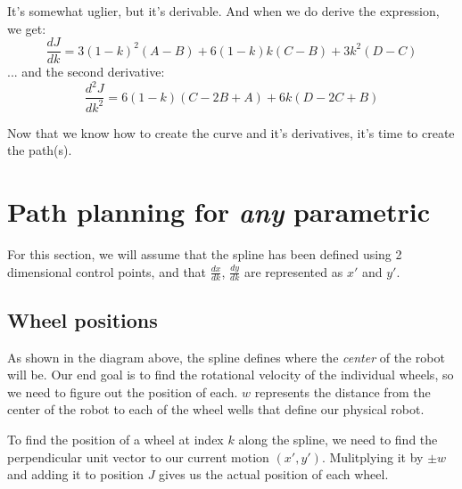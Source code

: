 \documentclass[12pt, english]{article}
\begin{document}
It's somewhat uglier, but it's derivable. And when we do derive the expression, we get:
\[
   \frac{dJ}{dk}=3(1-k)^{2}(A-B)+6(1-k)k(C-B)+3k^{2}(D-C)
\]
... and the second derivative:
\[
	\frac{d^2J}{dk^2}=6(1-k)(C-2B+A)+6k( D-2C+B)
\]

Now that we know how to create the curve and it's derivatives, it's time to create the path(s).


\section{Path planning for \textit{any} parametric}

For this section, we will assume that the spline has been defined using 2 dimensional control points, and that $\frac{dx}{dk}$, $\frac{dy}{dk}$ are represented as $x'$ and $y'$.

\subsection{Wheel positions}
\begin{center}
\end{center}

As shown in the diagram above, the spline defines where the \textit{center} of the robot will be. Our end goal is to find the rotational velocity of the individual wheels, so we need to figure out the position of each. $w$ represents the distance from the center of the robot to each of the wheel wells that define our physical robot.
\par
To find the position of a wheel at index $k$ along the spline, we need to find the perpendicular unit vector to our current motion $(x', y')$. Mulitplying it by $\pm w$ and adding it to position $J$ gives us the actual position of each wheel.
\end{document}
